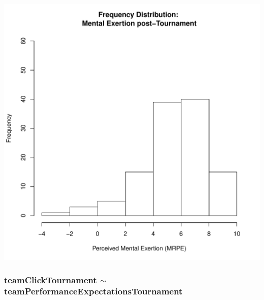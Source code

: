 \documentclass[12pt]{report}
\begin{document}
\includegraphics[scale =.4]{../images/distMentalPost.pdf}

























\newpage
\subsubsection{teamClickTournament $\sim$ teamPerformanceExpectationsTournament}

\newpage
\centering

\end{document}
